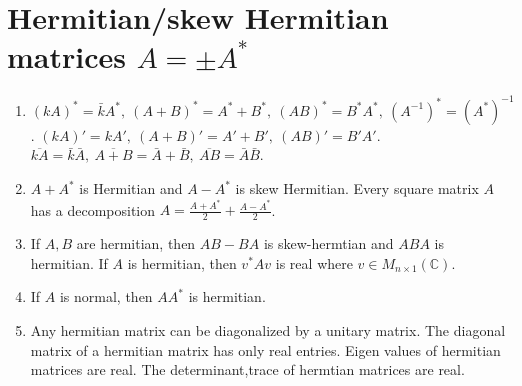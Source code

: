 \section{Hermitian/skew Hermitian matrices $A = \pm A^\ast$}
\begin{enumerate}
	\item $(kA)^\ast = \bar{k}A^\ast,\ (A+B)^\ast = A^\ast + B^\ast,\ (AB)^\ast = B^\ast A^\ast,\ (A^{-1})^\ast = (A^\ast)^{-1}$.
		\subitem $(kA)' = kA',\ (A+B)' = A'+B',\ (AB)' = B'A'$.
		\subitem $\overline{kA} = \bar{k} \bar{A},\ \overline{A+B} = \bar{A} + \bar{B},\ \overline{AB} = \bar{A}\bar{B}$.
	\item $A+A^\ast$ is Hermitian and $A-A^\ast$ is skew Hermitian.
		\subitem Every square matrix $A$ has a decomposition $A = \frac{A+A^\ast}{2} + \frac{A-A^\ast}{2}$.
	\item If $A,B$ are hermitian, then $AB-BA$ is skew-hermtian and $ABA$ is hermitian.
		\subitem If $A$ is hermitian, then $v^\ast A v$ is real where $v \in M_{n \times 1}(\mathbb{C})$.
	\item If $A$ is normal, then $AA^\ast$ is hermitian.
	\item Any hermitian matrix can be diagonalized by a unitary matrix.
		The diagonal matrix of a hermitian matrix has only real entries.
		Eigen values of hermitian matrices are real.
		\subitem The determinant,trace of hermtian matrices are real.
\end{enumerate}
